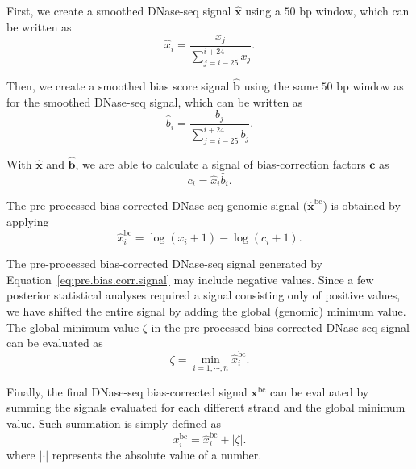 First, we create a smoothed DNase-seq signal $\hat{\mathbf{x}}$ using a $50$ bp window, which can be written as
\begin{equation}
  \label{eq:smoothed.raw.dnase}
  {\hat{x}}_{i} = \frac{{x}_{j}}{\sum_{j=i-25}^{i+24} {x}_{j}}.
\end{equation}

Then, we create a smoothed bias score signal $\hat{\mathbf{b}}$ using the same $50$ bp window as for the smoothed DNase-seq signal, which can be written as
\begin{equation}
  \label{eq:smoothed.bias.signal}
  {\hat{b}}_{i} = \frac{{b}_{j}}{\sum_{j=i-25}^{i+24} {b}_{j}}.
\end{equation}

With $\hat{\mathbf{x}}$ and $\hat{\mathbf{b}}$, we are able to calculate a signal of bias-correction factors $\mathbf{c}$ as
\begin{equation}
  \label{eq:bias.corr}
  {c}_{i} = {\hat{x}}_{i} {\hat{b}}_{i}.
\end{equation}

The pre-processed bias-corrected DNase-seq genomic signal ($\hat{\mathbf{x}}^{\text{bc}}$) is obtained by applying
\begin{equation}
  \label{eq:pre.bias.corr.signal}
  {\hat{x}}_{i}^{\text{bc}} = \log({x}_{i} + 1) - \log({c}_{i} + 1).
\end{equation}

The pre-processed bias-corrected DNase-seq signal generated by Equation~\ref{eq:pre.bias.corr.signal} may include negative values. Since a few posterior statistical analyses required a signal consisting only of positive values, we have shifted the entire signal by adding the global (genomic) minimum value. The global minimum value $\zeta$ in the pre-processed bias-corrected DNase-seq signal can be evaluated as
\begin{equation}
  \label{eq:pre.dnase.corr.min}
  \zeta = \min_{i = 1, \cdots, n} {\hat{x}}_{i}^{\text{bc}}.
\end{equation}

Finally, the final DNase-seq bias-corrected signal $\mathbf{x}^{\text{bc}}$ can be evaluated by summing the signals evaluated for each different strand and the global minimum value. Such summation is simply defined as
\begin{equation}
  \label{eq:bias.corr.signal}
  {x}_{i}^{\text{bc}} = {\hat{x}}_{i}^{\text{bc}} + |\zeta| .
\end{equation}
where $|\cdot|$ represents the absolute value of a number.

